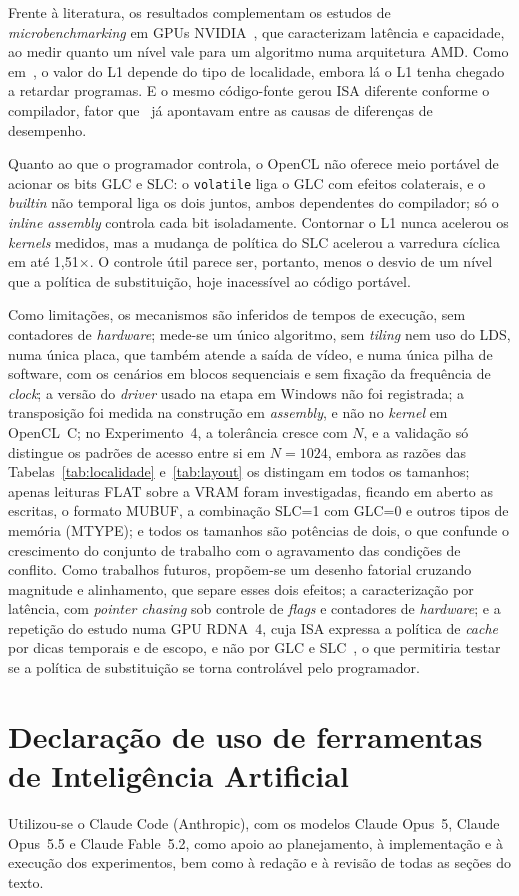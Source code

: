 \documentclass[12pt]{article}
\begin{document}
Frente à literatura, os resultados complementam os estudos de \textit{microbenchmarking}
em GPUs NVIDIA~\cite{wong2010, mei2017, jia2018}, que caracterizam latência e
capacidade, ao medir quanto um nível vale para um algoritmo numa arquitetura
AMD. Como em~\cite{jia2012}, o valor do L1 depende do tipo de localidade, embora
lá o L1 tenha chegado a retardar programas. E o mesmo código-fonte
gerou ISA diferente conforme o compilador, fator que~\cite{fang2011} já
apontavam entre as causas de diferenças de desempenho.

Quanto ao que o programador controla, o OpenCL não oferece meio portável de
acionar os bits GLC e SLC: o \texttt{volatile} liga o GLC com efeitos colaterais,
e o \textit{builtin} não temporal liga os dois juntos, ambos dependentes do
compilador; só o \textit{inline assembly} controla cada bit isoladamente. Contornar
o L1 nunca acelerou os \textit{kernels} medidos, mas a mudança de política do
SLC acelerou a varredura cíclica em até 1,51$\times$. O controle útil parece ser,
portanto, menos o desvio de um nível que a política de substituição, hoje inacessível
ao código portável.

Como limitações, os mecanismos são inferidos de tempos de execução, sem
contadores de \textit{hardware}; mede-se um único algoritmo, sem \textit{tiling}
nem uso do LDS, numa única placa, que também atende a saída de vídeo, e numa
única pilha de software, com os cenários em blocos sequenciais e sem fixação da
frequência de \textit{clock}; a versão do \textit{driver} usado na etapa em
Windows não foi registrada; a
transposição foi medida na construção em \textit{assembly}, e não no \textit{kernel} em
OpenCL~C; no Experimento~4, a tolerância cresce com $N$, e a validação só
distingue os padrões de acesso entre si em $N=1024$, embora as razões das Tabelas~\ref{tab:localidade} e~\ref{tab:layout} os distingam em todos os tamanhos; apenas leituras FLAT sobre a VRAM foram investigadas, ficando em aberto
as escritas, o formato MUBUF, a combinação SLC=1 com GLC=0 e outros tipos de memória (MTYPE); e todos os
tamanhos são potências de dois, o que confunde o crescimento do conjunto de
trabalho com o agravamento das condições de conflito. Como trabalhos futuros,
propõem-se um desenho fatorial cruzando magnitude e alinhamento, que separe esses
dois efeitos; a caracterização por latência, com \textit{pointer chasing} sob
controle de \textit{flags} e contadores de \textit{hardware}; e a repetição do
estudo numa GPU RDNA~4, cuja ISA expressa a política de \textit{cache} por dicas
temporais e de escopo, e não por GLC e SLC~\cite{llvmamdgpu}, o que permitiria
testar se a política de substituição se torna controlável pelo programador.

\section*{Declaração de uso de ferramentas de Inteligência Artificial}

Utilizou-se o Claude Code (Anthropic), com os modelos Claude Opus~5, Claude
Opus~5.5 e Claude Fable~5.2, como apoio ao planejamento, à implementação e à execução dos
experimentos, bem como à redação e à revisão de todas as seções do texto.



\end{document}

